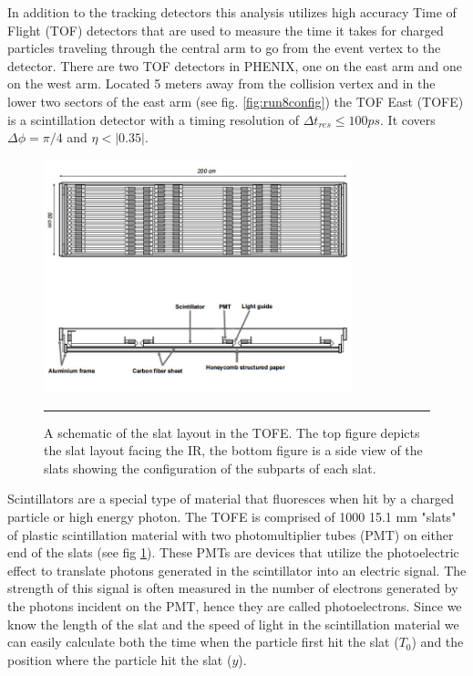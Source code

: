 In addition to the tracking detectors this analysis utilizes high accuracy Time of Flight (TOF) detectors that are used to measure the time it takes for charged particles traveling through the central arm to go from the event vertex to the detector\citep{TOFfocus}. There are two TOF detectors in PHENIX, one on the east arm and one on the west arm. Located 5 meters away from the collision vertex and in the lower two sectors of the east arm (see fig. \ref{fig:run8config}) the TOF East (TOFE) is a scintillation detector with a timing resolution of $\Delta t_{res} \leq 100 ps$. It covers $\Delta\phi = \pi / 4$ and $\eta < |0.35|$. 

\begin{figure}[htbp]
  \centering
    \includegraphics[width=0.8\textwidth]{Figures/TOFEschematic.jpg}
    \rule{35em}{0.5pt}
  \caption[A schematic of the slat layout in the TOFE.]{A schematic of the slat layout in the TOFE. The top figure depicts the slat layout facing the IR, the bottom figure is a side view of the slats showing the configuration of the subparts of each slat.}
  \label{fig:TOFEschematic}
\end{figure}

Scintillators are a special type of material that fluoresces when hit by a charged particle or high energy photon. The TOFE is comprised of 1000 15.1 mm "slats" of plastic scintillation material with two photomultiplier tubes (PMT) on either end of the slats (see fig \ref{fig:TOFEschematic}). These PMTs are devices that utilize the photoelectric effect to translate photons generated in the scintillator into an electric signal. The strength of this signal is often measured in the number of electrons generated by the photons incident on the PMT, hence they are called photoelectrons. Since we know the length of the slat and the speed of light in the scintillation material we can easily calculate both the time when the particle first hit the slat ($T_{0}$) and the position where the particle hit the slat ($y$).

